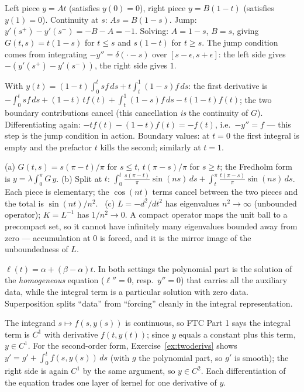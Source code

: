 \documentclass{essay}
\begin{document}
\begin{description}[leftmargin=0pt, itemsep=6pt]
  \item[\ref{ex:green-construct}.] Left piece $y = At$ (satisfies $y(0)=0$), right piece $y = B(1-t)$ (satisfies $y(1)=0$). Continuity at $s$: $As = B(1-s)$. Jump: $y'(s^+) - y'(s^-) = -B - A = -1$. Solving: $A = 1 - s$, $B = s$, giving $G(t,s) = t(1-s)$ for $t \le s$ and $s(1-t)$ for $t \ge s$. The jump condition comes from integrating $-y'' = \delta(\cdot - s)$ over $[s - \epsilon, s + \epsilon]$: the left side gives $-(y'(s^+) - y'(s^-))$, the right side gives $1$.

  \item[\ref{ex:green-verify}.] With $y(t) = (1-t)\int_0^t s f\,ds + t\int_t^1 (1-s) f\,ds$: the first derivative is $-\int_0^t s f\,ds + (1-t)\,t f(t) + \int_t^1 (1-s)f\,ds - t(1-t)f(t)$; the two boundary contributions cancel (this cancellation \emph{is} the continuity of $G$). Differentiating again: $-t f(t) - (1-t) f(t) = -f(t)$, i.e.\ $-y'' = f$ --- this step is the jump condition in action. Boundary values: at $t=0$ the first integral is empty and the prefactor $t$ kills the second; similarly at $t = 1$.

  \item[\ref{ex:eigen}.] (a) $G(t,s) = s(\pi - t)/\pi$ for $s \le t$, $t(\pi - s)/\pi$ for $s \ge t$; the Fredholm form is $y = \lambda \int_0^\pi G\, y$. (b) Split at $t$:
    $\int_0^t \frac{s(\pi - t)}{\pi}\sin(ns)\,ds + \int_t^\pi \frac{t(\pi - s)}{\pi}\sin(ns)\,ds$. Each piece is elementary; the $\cos(nt)$ terms cancel between the two pieces and the total is $\sin(nt)/n^2$. \checkmark\ (c) $L = -d^2/dt^2$ has eigenvalues $n^2 \to \infty$ (unbounded operator); $K = L^{-1}$ has $1/n^2 \to 0$. A compact operator maps the unit ball to a precompact set, so it cannot have infinitely many eigenvalues bounded away from zero --- accumulation at $0$ is forced, and it is the mirror image of the unboundedness of $L$.

  \item[\ref{ex:inhomog-bc}.] $\ell(t) = \alpha + (\beta - \alpha)t$. In both settings the polynomial part is the solution of the \emph{homogeneous} equation ($\ell'' = 0$, resp.\ $y'' = 0$) that carries all the auxiliary data, while the integral term is a particular solution with zero data. Superposition splits ``data'' from ``forcing'' cleanly in the integral representation.

  \item[\ref{ex:bootstrap}.] The integrand $s \mapsto f(s, y(s))$ is continuous, so FTC Part 1 says the integral term is $C^1$ with derivative $f(t, y(t))$; since $y$ equals a constant plus this term, $y \in C^1$. For the second-order form, Exercise~\ref{ex:twoderivs} shows $y' = g' + \int_0^t f(s,y(s))\,ds$ (with $g$ the polynomial part, so $g' $ is smooth); the right side is again $C^1$ by the same argument, so $y \in C^2$. Each differentiation of the equation trades one layer of kernel for one derivative of $y$.


\end{description}
\end{document}
